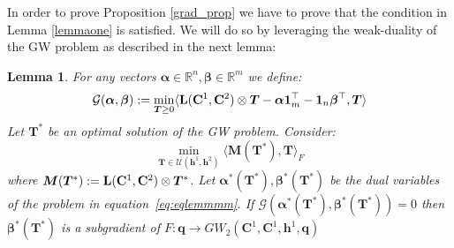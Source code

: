 \documentclass{article}
\newcommand{\scalar}[2]{\langle #1 , #2 \rangle}
\def\eqref#1{equation~\ref{#1}}
\def\vh{{\bm{h}}}
\def\mM{{\bm{M}}}
\def\mT{{\bm{T}}}
\newcommand{\R}{\mathbb{R}}
\def\alphab{\boldsymbol\alpha}
\def\betab{\boldsymbol\beta}
\def\L{{\bf L}}
\def\R{{\mathbb{R}}}
\def\one{{\mathbf{1}}}
\newcommand{\qbf}{\mathbf{q}}
\newcommand{\C}{\mathbf{C}}
\newcommand{\gw}{GW}
\newtheorem{lemma}{Lemma}
\begin{document}
	In order to prove Proposition \ref{grad_prop} we have to prove that the condition in Lemma \ref{lemmaone} is satisfied. We will do so by leveraging the weak-duality of the GW problem as described in the next lemma:
	\begin{lemma}
		For any vectors $\alphab \in \R^{n},\betab \in \R^{m}$ we define: 
		\begin{equation*}
		\mathcal{G}(\alphab,\betab):=\min_{\mT \geq 0} \scalar{\L(\C^1,\C^2)\otimes \mT-\alphab \one_m^{\top}- \one_n\betab^{\top}}{\mT}{}
		\end{equation*}
		Let $\mT^{*}$ be an optimal solution of the GW problem. Consider:
		\begin{equation}
		\label{eq:eqlemmmm}
		\min_{\mT \in \mathcal{U}(\vh^1,\vh^2)} \scalar{\mM(\mT^{*})}{\mT}_{F}
		\end{equation}
		where $\mM(\mT^{*}):=\L(\C^1,\C^2)\otimes \mT^{*}$. Let $\alphab^{*}(\mT^{*}),\betab^{*}(\mT^{*})$ be the dual variables of the problem in \eqref{eq:eqlemmmm}. If $\mathcal{G}(\alphab^{*}(\mT^{*}),\betab^{*}(\mT^{*}))= 0$ then $\betab^{*}(\mT^{*})$ is a subgradient of $F: \qbf \rightarrow \gw_2(\C^1,\C^1,\vh^1,\qbf)$
	\end{lemma}
\end{document}
